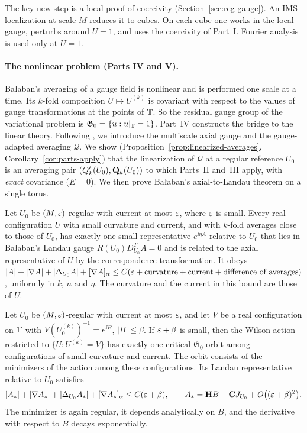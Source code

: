 The key new step is a local proof of coercivity (Section~\ref{sec:reg-gauge}). An IMS localization at scale $M$ reduces it to cubes. On each cube one works in the local gauge, perturbs around $U=1$, and uses the coercivity of Part~I. Fourier analysis is used only at $U=1$.

\paragraph{The nonlinear problem (Parts IV and V).} Ba\l aban's averaging of a gauge field is nonlinear and is performed one scale at a time. Its $k$-fold composition $U\mapsto U^{(k)}$ is covariant with respect to the values of gauge transformations at the points of $\mathbb T$. So the residual gauge group of the variational problem is $\mathfrak G_0=\{u:u|_\mathbb T=1\}$. Part~IV constructs the bridge to the linear theory. Following \cite{BalAvg,BalReg}, we introduce the multiscale axial gauge and the gauge-adapted averaging $\mathcal Q$. We show (Proposition~\ref{prop:linearized-averages}, Corollary~\ref{cor:parts-apply}) that the linearization of $\mathcal Q$ at a regular reference $U_0$ is an averaging pair $(Q'_k(U_0),\mathbf Q_k(U_0))$ to which Parts~II and~III apply, with \emph{exact} covariance ($E=0$). We then prove Ba\l aban's axial-to-Landau theorem \cite[Theorem~2]{BalReg} on a single torus.

\begin{maintheorem}\label{thm:H}
Let $U_0$ be $(M,\varepsilon)$-regular with current at most $\varepsilon$, where $\varepsilon$ is small. Every real configuration $U$ with small curvature and current, and with $k$-fold averages close to those of $U_0$, has exactly one small representative $e^{\ii\eta A}$ relative to $U_0$ that lies in Ba\l aban's Landau gauge $R(U_0)D^T_{U_0}A=0$ and is related to the axial representative of $U$ by the correspondence transformation. It obeys $|A|+|\nabla A|+|\Delta_{U_0}A|+[\nabla A]_\alpha\le C(\varepsilon+\text{curvature}+\text{current}+\text{difference of averages})$, uniformly in $k$, $n$ and $\eta$. The curvature and the current in this bound are those of $U$.
\end{maintheorem}

\begin{maintheorem}\label{thm:I}
Let $U_0$ be $(M,\varepsilon)$-regular with current at most $\varepsilon$, and let $V$ be a real configuration on $\mathbb T$ with $V(U_0^{(k)})^{-1}=e^{\ii B}$, $|B|\le\beta$. If $\varepsilon+\beta$ is small, then the Wilson action restricted to $\{U:U^{(k)}=V\}$ has exactly one critical $\mathfrak G_0$-orbit among configurations of small curvature and current. The orbit consists of the minimizers of the action among these configurations. Its Landau representative relative to $U_0$ satisfies
\[
|A_*|+|\nabla A_*|+|\Delta_{U_0}A_*|+[\nabla A_*]_\alpha\le C(\varepsilon+\beta),\qquad A_*=\mathbf H B-\mathbf C J_{U_0}+O\big((\varepsilon+\beta)^2\big).
\]
The minimizer is again regular, it depends analytically on $B$, and the derivative with respect to $B$ decays exponentially.
\end{maintheorem}

